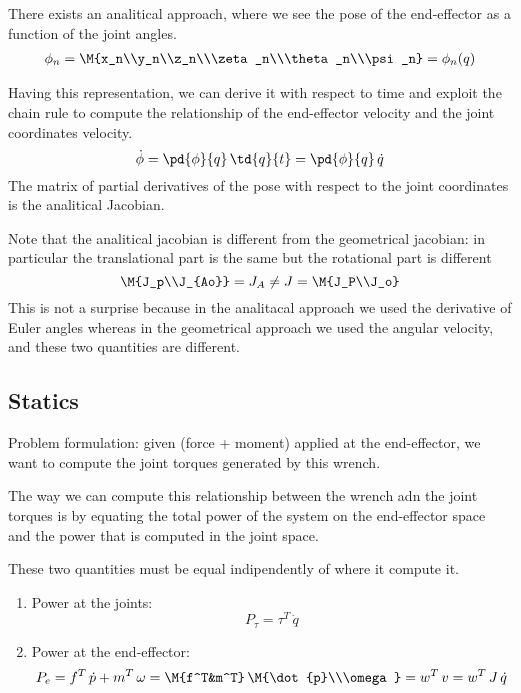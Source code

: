 There exists an analitical approach, where we see the pose of the end-effector as a function of the joint angles.
\begin{gather*}
\phi_n = \M{x_n\\y_n\\z_n\\\zeta_n\\\theta_n\\\psi_n} = \phi_n(q)
\end{gather*}

Having this representation, we can derive it with respect to time and exploit the chain rule to compute the relationship of the end-effector velocity and the joint coordinates velocity.
\[\dot{\phi} = \pd{\phi}{q}\,\td{q}{t} = \pd{\phi}{q}\,\dot{q}\]
The matrix of partial derivatives of the pose with respect to the joint coordinates is the analitical Jacobian. 

Note that the analitical jacobian is different from the geometrical jacobian: in particular the translational part is the same but the rotational part is different
\[\M{J_p\\J_{Ao}} = J_A \ne J = \M{J_P\\J_o}\]
This is not a surprise because in the analitacal approach we used the derivative of Euler angles whereas in the geometrical approach we used the angular velocity, and these two quantities are different.

\subsection{Statics}

Problem formulation: given  (force + moment) applied at the end-effector, we want to compute the joint torques generated by this wrench.

The way we can compute this relationship between the wrench adn the joint torques is by equating the total power of the system on the end-effector space and the power that is computed in the joint space.

These two quantities must be equal indipendently of where it compute it.

\begin{enumerate}
\item Power at the joints:
\[P_{\tau} = \tau^T\,\dot{q}\]
\item Power at the end-effector:
\[P_e = f^T\,\dot{p}+m^T\,\omega = \M{f^T&m^T}\,\M{\dot{p}\\\omega} = w^T\,v = w^T\,J\,\dot{q}\]
\end{enumerate}

